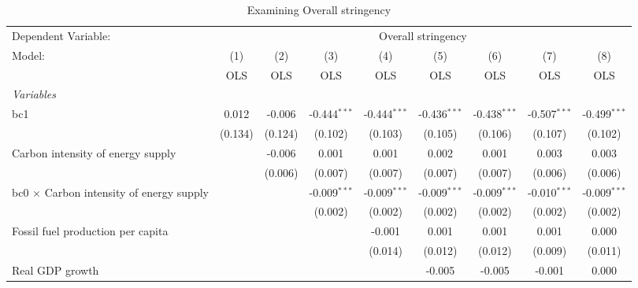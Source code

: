 
\begin{table}[htbp]
   \caption{Examining Overall stringency}
   \centering
   \begin{tabular}{lcccccccc}
      \toprule
      Dependent Variable: & \multicolumn{8}{c}{Overall stringency}\\
      Model:                                          & (1)     & (2)     & (3)            & (4)            & (5)            & (6)            & (7)            & (8)\\  
                                                      &  OLS    & OLS     & OLS            & OLS            & OLS            & OLS            & OLS            & OLS\\  
      \midrule
      \emph{Variables}\\
      bc1                                             & 0.012   & -0.006  & -0.444$^{***}$ & -0.444$^{***}$ & -0.436$^{***}$ & -0.438$^{***}$ & -0.507$^{***}$ & -0.499$^{***}$\\   
                                                      & (0.134) & (0.124) & (0.102)        & (0.103)        & (0.105)        & (0.106)        & (0.107)        & (0.102)\\   
      Carbon intensity of energy supply               &         & -0.006  & 0.001          & 0.001          & 0.002          & 0.001          & 0.003          & 0.003\\   
                                                      &         & (0.006) & (0.007)        & (0.007)        & (0.007)        & (0.007)        & (0.006)        & (0.006)\\   
      bc0 $\times$ Carbon intensity of energy supply  &         &         & -0.009$^{***}$ & -0.009$^{***}$ & -0.009$^{***}$ & -0.009$^{***}$ & -0.010$^{***}$ & -0.009$^{***}$\\   
                                                      &         &         & (0.002)        & (0.002)        & (0.002)        & (0.002)        & (0.002)        & (0.002)\\   
      Fossil fuel production per capita               &         &         &                & -0.001         & 0.001          & 0.001          & 0.001          & 0.000\\   
                                                      &         &         &                & (0.014)        & (0.012)        & (0.012)        & (0.009)        & (0.011)\\   
      Real GDP growth                                 &         &         &                &                & -0.005         & -0.005         & -0.001         & 0.000\\   

\end{tabular}
\end{table}
